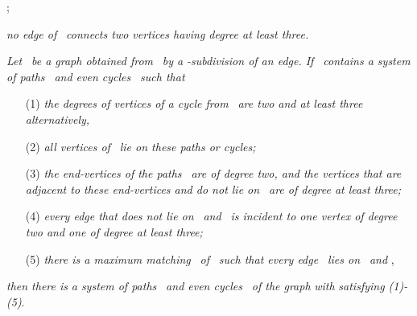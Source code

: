 \documentclass[fleqn,12pt,twoside]{article}
\begin{document}
\begin{description}
\item[(a)] ;

\item[(b)] \textit{no edge of }\textit{\ connects two vertices having degree at
least three.}

\item[ ] \textit{Let }\textit{\ be a graph obtained from }\textit{\ by a }\textit{-subdivision of an edge. If }\textit{\
contains a system of paths }\textit{\ and even cycles }\textit{\ such that }

\begin{enumerate}
\item[(1)] \textit{the degrees of vertices of a cycle from }\textit{\ are two and at least three alternatively,}

\item[(2)] \textit{all vertices of }\textit{\ lie on these paths or
cycles;}

\item[(3)] \textit{the end-vertices of the paths }\textit{\
are of degree two, and the vertices that are adjacent to these
end-vertices and do not lie on } \textit{\ are of
degree at least three;}

\item[(4)] \textit{every edge that does not lie on }\textit{\ and }\textit{\ is incident to one vertex of
degree two and one of degree at least three;}

\item[(5)] \textit{there is a maximum matching }\textit{\ of }\textit{\ such that every edge }\textit{\ lies on }\textit{\ and },
\end{enumerate}

\item \textit{then there is} \textit{a system of paths }\textit{\ and even cycles
}\textit{\ of the
graph } \textit{with} 
\textit{satisfying (1)-(5)}.
\end{description}
\end{document}

